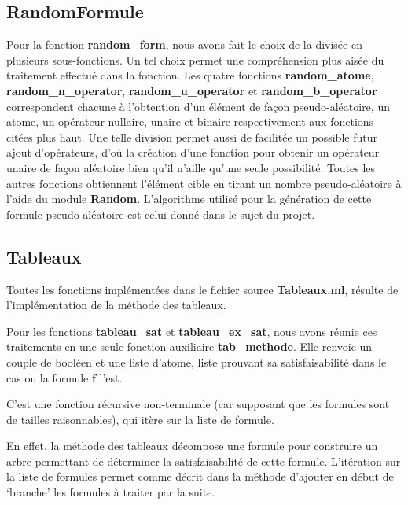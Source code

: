 \documentclass[12pt]{article}
\begin{document}
    \subsection{RandomFormule}\label{random-form}

    Pour la fonction \textbf{random\_form}, nous avons fait le choix de la 
    divisée en plusieurs sous-fonctions. Un tel choix permet une compréhension 
    plus aisée du traitement effectué dans la fonction. Les quatre fonctions 
    \textbf{random\_atome}, \textbf{random\_n\_operator}, 
    \textbf{random\_u\_operator} et \textbf{random\_b\_operator} correspondent 
    chacune à l'obtention d'un élément de façon pseudo-aléatoire, un atome, un 
    opérateur nullaire, unaire et binaire respectivement aux fonctions citées 
    plus haut. Une telle division permet aussi de facilitée un possible futur 
    ajout d'opérateurs, d'où la création d'une fonction pour obtenir un 
    opérateur unaire de façon aléatoire bien qu'il n'aille qu'une seule 
    possibilité. Toutes les autres fonctions obtiennent l'élément cible en 
    tirant un nombre pseudo-aléatoire à l'aide du module \textbf{Random}. 
    L'algorithme utilisé pour la génération de cette formule pseudo-aléatoire 
    est celui donné dans le sujet du projet.

    \subsection{Tableaux}

    Toutes les fonctions implémentées dans le fichier source \textbf{Tableaux.ml}, 
    résulte de l'implémentation de la méthode des tableaux.   

    \vphantom{}

    Pour les fonctions \textbf{tableau\_sat} et \textbf{tableau\_ex\_sat}, nous 
    avons réunie ces traitements en une seule fonction auxiliaire 
    \textbf{tab\_methode}. Elle renvoie un couple de booléen et une liste 
    d'atome, liste prouvant sa satisfaisabilité dans le cas ou la formule 
    \textbf{f} l'est. 

    C'est une fonction récursive non-terminale (car supposant que les formules 
    sont de tailles raisonnables), qui itère sur la liste de formule.

    En effet, la méthode des tableaux décompose une formule pour construire un 
    arbre permettant de déterminer la satisfaisabilité de cette formule. 
    L'itération sur la liste de formules permet comme décrit dans la méthode 
    d'ajouter en début de `branche' les formules à traiter par la suite. 
\end{document}
